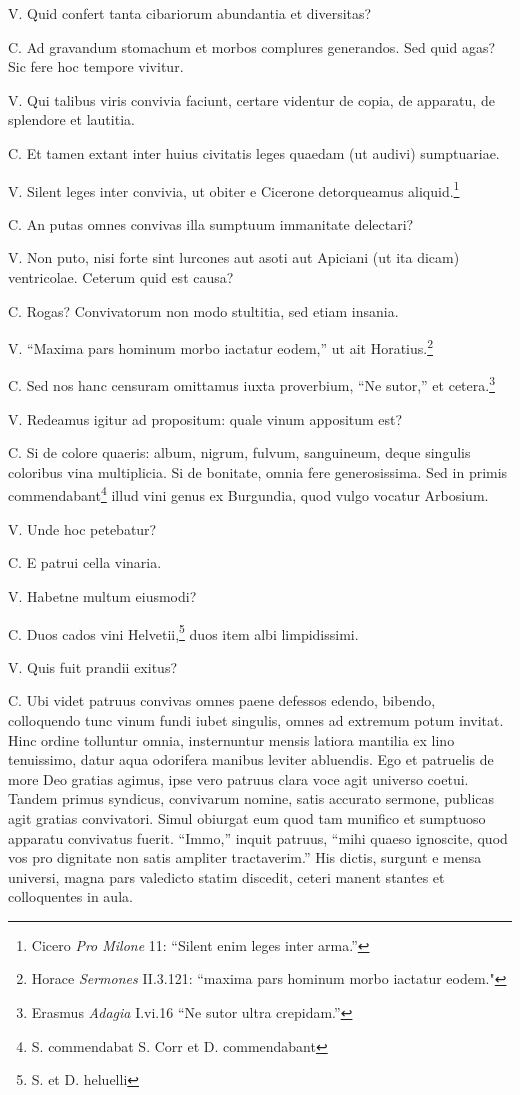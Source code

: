 \documentclass{article}
\begin{document}
V. Quid confert tanta cibariorum abundantia et diversitas?

C. Ad gravandum stomachum et morbos complures generandos. Sed quid agas? Sic fere hoc tempore vivitur.

V. Qui talibus viris convivia faciunt, certare videntur de copia, de apparatu, de splendore et lautitia.

C. Et tamen extant inter huius civitatis leges quaedam (ut audivi) sumptuariae.

V. Silent leges inter convivia, ut obiter e Cicerone detorqueamus aliquid.\footnote{Cicero \emph{Pro Milone} 11: ``Silent enim leges inter arma.''}

C. An putas omnes convivas illa sumptuum immanitate delectari?

V. Non puto, nisi forte sint lurcones aut asoti aut Apiciani (ut ita dicam) ventricolae. Ceterum quid est causa?

C. Rogas? Convivatorum non modo stultitia, sed etiam insania.

V. “Maxima pars hominum morbo iactatur eodem,” ut ait Horatius.\footnote{Horace \emph{Sermones} II.3.121: ``maxima pars hominum morbo iactatur eodem."}

C. Sed nos hanc censuram omittamus iuxta proverbium, ``Ne sutor,'' et cetera.\footnote{Erasmus \emph{Adagia} I.vi.16 ``Ne sutor ultra crepidam.''}

V. Redeamus igitur ad propositum: quale vinum appositum est?

C. Si de colore quaeris: album, nigrum, fulvum, sanguineum, deque singulis coloribus vina multiplicia. Si de bonitate, omnia fere generosissima. Sed in primis commendabant\footnote{S. commendabat S. Corr et D. commendabant} illud vini genus ex Burgundia, quod vulgo vocatur Arbosium.

V. Unde hoc petebatur?

C. E patrui cella vinaria.

V. Habetne multum eiusmodi?

C. Duos cados vini Helvetii,\footnote{S. et D. heluelli} duos item albi limpidissimi.

V. Quis fuit prandii exitus?

C. Ubi videt patruus convivas omnes paene defessos edendo, bibendo, colloquendo tunc vinum fundi iubet singulis, omnes ad extremum potum invitat. Hinc ordine tolluntur omnia, insternuntur mensis latiora mantilia ex lino tenuissimo, datur aqua odorifera manibus leviter abluendis. Ego et patruelis de more Deo gratias agimus, ipse vero patruus clara voce agit universo coetui. Tandem primus syndicus, convivarum nomine, satis accurato sermone, publicas agit gratias convivatori. Simul obiurgat eum quod tam munifico et sumptuoso apparatu convivatus fuerit. ``Immo,'' inquit patruus, ``mihi quaeso ignoscite, quod vos pro dignitate non satis ampliter tractaverim.'' His dictis, surgunt e mensa universi, magna pars valedicto statim discedit, ceteri manent stantes et colloquentes in aula.
\end{document}
